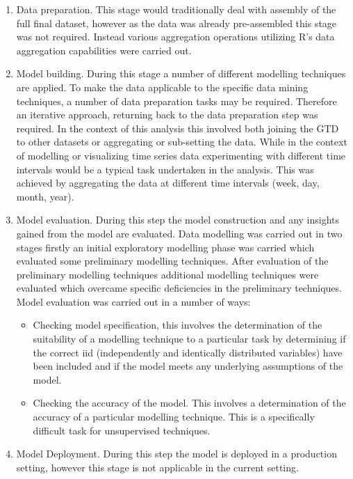 \begin{enumerate}
\item Data preparation. This stage would traditionally deal with assembly of the full final dataset, however as the data was already pre-assembled this stage was not required. Instead various aggregation operations utilizing R's data aggregation capabilities were carried out.  
\item Model building. During this stage a number of different modelling techniques are applied. To make the data applicable to the specific data mining techniques, a number of data preparation tasks may be required. Therefore an iterative approach, returning back to the data preparation step was required. In the context of this analysis this involved both joining the GTD to other datasets or aggregating or sub-setting the data. While in the context of modelling or visualizing time series data experimenting with different time intervals would be a typical task undertaken in the analysis. This was achieved by aggregating the data at different time intervals (week, day, month, year).
\item Model evaluation. During this step the model construction and any insights gained from the model are evaluated. Data modelling was carried out in two stages firstly an initial exploratory modelling phase was carried which evaluated some preliminary modelling techniques. After evaluation of the preliminary modelling techniques additional modelling techniques were evaluated which overcame specific deficiencies in the preliminary techniques. Model evaluation was carried out in a number of ways:
\begin{itemize}
 \item Checking model specification, this involves the determination of the suitability of a modelling technique to a particular task by determining if the correct iid (independently and identically distributed variables) have been included and if the model meets any underlying assumptions of the model.
 \item Checking the accuracy of the model. This involves  a determination of the accuracy of a particular modelling technique. This is a specifically difficult task for unsupervised techniques.
 \end{itemize} 
\item Model Deployment. During this step the model is deployed in a production setting, however this stage is not applicable in the current setting. 
\end{enumerate}

